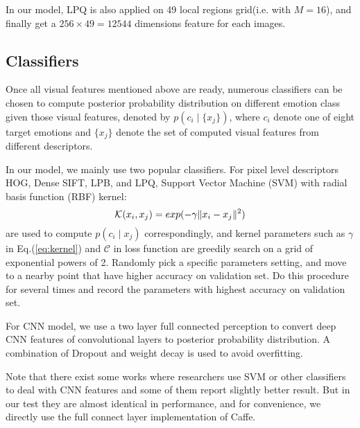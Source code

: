 \documentclass[conference]{IEEEtran}
\newcommand{\eqref}[1]{Eq.(\ref{#1})}
\begin{document}
In our model, LPQ is also applied on 49 local regions grid(i.e. with $M=16$), and finally get a $256\times49=12544$ dimensions feature for each images.

\subsection{Classifiers}
Once all visual features mentioned above are ready, numerous classifiers can be chosen to compute posterior probability distribution on different emotion class given those visual features, denoted by $p(c_i\mid \{x_j\})$, where $c_i$ denote one of eight target emotions and $\{x_j\}$ denote the set of computed visual features from different descriptors.

In our model, we mainly use two popular classifiers. For pixel level descriptors HOG, Dense SIFT, LPB, and LPQ, Support Vector Machine (SVM) with radial basis function (RBF) kernel:
\begin{equation}
\label{eq:kernel}
\mathcal{K}(x_i,x_j)=exp(-\gamma \Arrowvert x_i-x_j\Arrowvert ^2)
\end{equation}
are used to compute $p(c_i\mid x_j)$ correspondingly, and kernel parameters such as $\gamma $ in \eqref{eq:kernel} and $\mathcal{C}$ in loss function are greedily search on a grid of exponential powers of 2. Randomly pick a specific parameters setting, and move to a nearby point that have higher accuracy on validation set. Do this procedure for several times and record the parameters with highest accuracy on validation set.

For CNN model, we use a two layer full connected perception to convert deep CNN features of convolutional layers to posterior probability distribution. A combination of Dropout and weight decay is used to avoid overfitting.

Note that there exist some works where researchers use SVM or other classifiers to deal with CNN features and some of them report slightly better result. But in our test they are almost identical in performance, and for convenience, we directly use the full connect layer implementation of Caffe.
\end{document}
